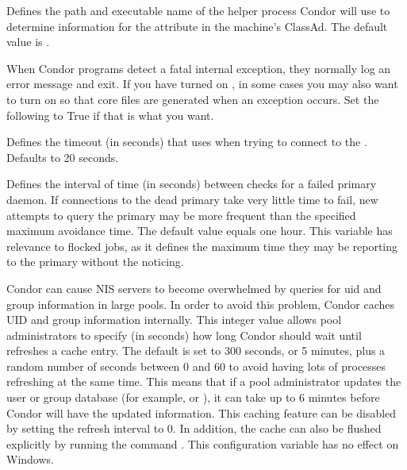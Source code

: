 \begin{description}
\label{param:CkptProbe}
\item[\Macro{CKPT\_PROBE}]
  Defines the path and executable name of the helper process Condor will use to
  determine information for the  attribute
  in the machine's ClassAd. 
  The default value is .

\label{param:AbortOnException}
\item[\Macro{ABORT\_ON\_EXCEPTION}]
  When Condor programs detect a fatal internal exception, they
  normally log an error message and exit.  If you have turned on
  , in some cases you may also want to turn
  on  so that core files are generated
  when an exception occurs.  Set the following to True if that is what
  you want.

\label{param:QQueryTimeout}
\item[\Macro{Q\_QUERY\_TIMEOUT}]
  Defines the timeout (in seconds) that  uses when trying to
  connect to the .  Defaults to 20 seconds.

\label{param:DeadCollectorMaxAvoidanceTime}
\item[\Macro{DEAD\_COLLECTOR\_MAX\_AVOIDANCE\_TIME}]
  Defines the interval of time
  (in seconds) between checks for a failed primary  daemon.
  If connections to the dead primary  take very
  little time to fail, new attempts to query the primary  may
  be more frequent than the specified maximum avoidance time.
  The default value equals one hour.
  This variable has relevance to flocked jobs, as it defines 
  the maximum time they may be reporting to the primary 
  without the  noticing.

\label{param:PasswdCacheRefresh}
\item[\Macro{PASSWD\_CACHE\_REFRESH}]
  Condor can cause NIS servers to become overwhelmed by queries for uid
  and group information in large pools. In order to avoid this problem,
  Condor caches UID and group information internally. This integer value allows
  pool administrators to specify (in seconds) how long Condor should wait
  until refreshes a cache entry. The default is set to 300 seconds, or
  5 minutes, plus a random number of seconds between 0 and 60 to avoid
  having lots of processes refreshing at the same time.
  This means that if a pool administrator updates the user
  or group database (for example,  or ),
  it can take up
  to 6 minutes before Condor will have the updated information. This
  caching feature can be disabled by setting the refresh interval to
  0. In addition, the cache can also be flushed explicitly by running
  the command .
  This configuration variable has no effect on Windows.


\end{description}
